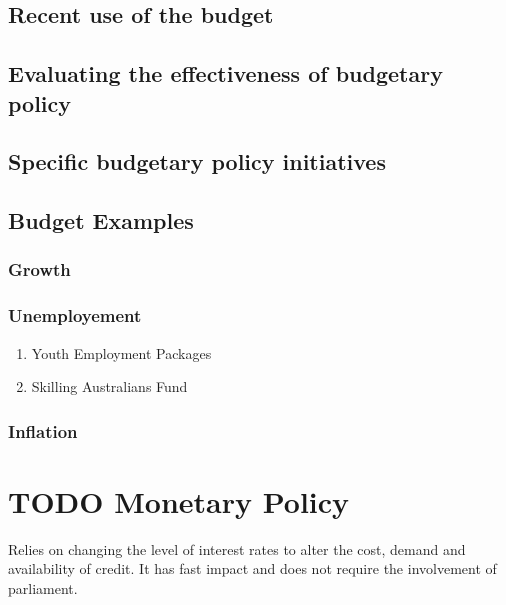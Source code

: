 \documentclass[11pt]{article}
\begin{document}
\subsection{Recent use of the budget}
\label{sec-2-1}

\subsection{Evaluating the effectiveness of budgetary policy}
\label{sec-2-2}

\subsection{Specific budgetary policy initiatives}
\label{sec-2-3}


\subsection{Budget Examples}
\label{sec-2-4}

\subsubsection{Growth}
\label{sec-2-4-1}

\subsubsection{Unemployement}
\label{sec-2-4-2}

\begin{enumerate}
\item Youth Employment Packages
\label{sec-2-4-2-1}

\item Skilling Australians Fund
\label{sec-2-4-2-2}
\end{enumerate}

\subsubsection{Inflation}
\label{sec-2-4-3}

\section{{\bfseries\sffamily TODO} Monetary Policy}
\label{sec-3}

Relies on changing the level of interest rates to alter the cost,
demand and availability of credit. It has fast impact and does not
require the involvement of parliament.
\end{document}
